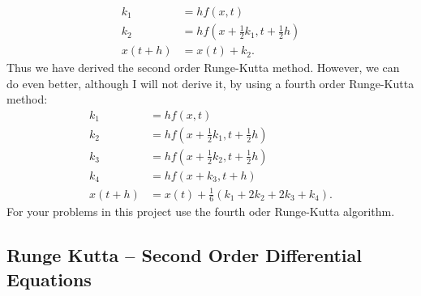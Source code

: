 \documentclass{article}
\begin{document}
\begin{align*}
k_1 & = hf(x, t)\\
k_2 & = hf(x +\frac{1}{2}k_1, t + \frac{1}{2}h)\\
x(t+h) & = x(t) + k_2.
\end{align*}
Thus we have derived the second order Runge-Kutta method. However, we can do even better, although I will not derive it,  by using a fourth order Runge-Kutta method:
\begin{align*}
k_1 & = hf(x, t)\\
k_2 & = hf(x +\frac{1}{2}k_1, t + \frac{1}{2}h)\\
k_3 & = hf(x+\frac{1}{2}k_2, t+\frac{1}{2}h)\\
k_4 & = hf(x+k_3, t+h)\\ 
x(t+h) & = x(t) + \frac{1}{6}(k_1 + 2k_2+2k_3+k_4).
\end{align*}
For your problems in this project use the fourth oder Runge-Kutta algorithm.

\subsection{Runge Kutta -- Second Order Differential Equations}
\end{document}

